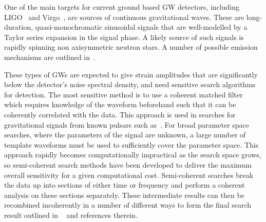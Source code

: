 %
%
One of the main targets for current ground based \gls{GW} detectors, including \gls{LIGO}~\citep{abbott2009LIGOLaser, aasi2015AdvancedLIGO} and Virgo~\citep{acernese2008StatusVirgo, acernese2015AdvancedVirgo}, are sources of continuous gravitational waves. These are long-duration, quasi-monochromatic  sinusoidal signals that are well-modelled by a Taylor series expansion in the signal phase. A likely source of such signals is rapidly spinning non axisymmetric neutron stars.  A number of possible emission mechanisms are outlined in~\citep{prix2009GravitationalWaves,owen2009ProbingNeutron}.

%
%
These types of \glspl{GW} are expected to give strain amplitudes that are significantly below the detector's noise spectral density, and need sensitive search algorithms for detection. The most sensitive method is to use a coherent matched filter which requires knowledge of the waveform beforehand such that it can be coherently correlated with the data. This approach is used in searches for gravitational signals from known pulsars such as~\citep{dupuis2005BayesianEstimation,astone2010MethodDetection,schutz1998DataAnalysis,collaboration2017FirstSearch,abbott2019SearchesGravitational}. For broad parameter space searches, where the parameters of the signal are unknown, a large number of template waveforms must be used to sufficiently cover the parameter space.  This approach rapidly becomes computationally impractical as the search space grows, so semi-coherent search methods have been developed to deliver the maximum overall sensitivity for a given computational cost. Semi-coherent searches break the data up into sections of either time or frequency and perform a coherent analysis on these sections separately. These intermediate results can then be recombined incoherently in a number of different ways to form the final search result outlined in ~\citep{creighton2000SearchingPeriodic,abbott2019AllskySearch} and references therein.


